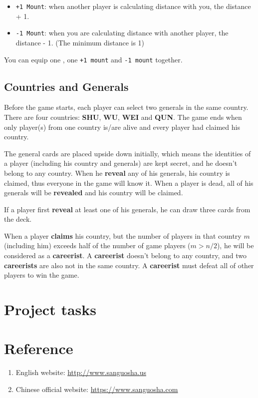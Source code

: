 \documentclass[11pt,a4paper]{article}
\begin{document}
\begin{itemize}
\item \texttt{+1 Mount}: when another player is calculating distance with you, the distance + 1.
\item \texttt{-1 Mount}: when you are calculating distance with another player, the distance - 1. (The minimum distance is 1)
\end{itemize}

You can equip one , one  \texttt{+1 mount} and \texttt{-1 mount} together.

\subsection{Countries and Generals}

Before the game starts, each player can select two generals in the same country. There are four countries: \textbf{SHU}, \textbf{WU}, \textbf{WEI} and \textbf{QUN}. The game ends when only player(s) from one country is/are alive and every player had claimed his country. \bigskip


The general cards are placed upside down initially, which means the identities of a player (including his country and generals) are kept secret, and he doesn't belong to any country. When he \textbf{reveal} any of his generals, his country is claimed, thus everyone in the game will know it. When a player is dead, all of his generals will be \textbf{revealed} and his country will be claimed. \bigskip

If a player first \textbf{reveal} at least one of his generals, he can draw three cards from the deck. \bigskip

When a player \textbf{claims} his country, but the number of players in that country $m$ (including him) exceeds half of the number of game players ($m>n/2$), he will be considered as a \textbf{careerist}. A \textbf{careerist} doesn't belong to any country, and two \textbf{careerists} are also not in the same country. A \textbf{careerist} must defeat all of other players to win the game.



\section{Project tasks}




\section{Reference}
\begin{enumerate}
\item English website: \url{http://www.sanguosha.us}
\item Chinese official website: \url{https://www.sanguosha.com}
\end{enumerate}
\end{document}
